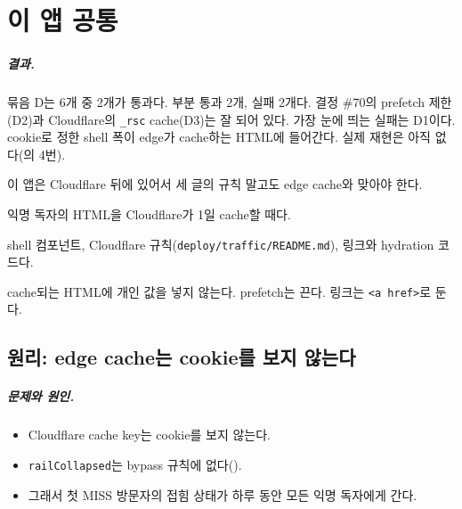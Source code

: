 \chapter{이 앱 공통}\label{ch:cross}

\paragraph{결과.}
묶음 D는 6개 중 2개가 통과다. 부분 통과 2개, 실패 2개다.
결정 \#70의 prefetch 제한(D2)과 Cloudflare의 \texttt{\_rsc} cache(D3)는 잘 되어 있다.
가장 눈에 띄는 실패는 D1이다. cookie로 정한 shell 폭이 edge가 cache하는 HTML에 들어간다.
실제 재현은 아직 없다(의 4번).

\begin{inbrief}
  \item[Why] 이 앱은 Cloudflare 뒤에 있어서 세 글의 규칙 말고도 edge cache와 맞아야 한다.
  \item[When] 익명 독자의 HTML을 Cloudflare가 1일 cache할 때다.
  \item[Where] shell 컴포넌트, Cloudflare 규칙(\texttt{deploy/traffic/README.md}), 링크와 hydration 코드다.
  \item[How] cache되는 HTML에 개인 값을 넣지 않는다. prefetch는 끈다. 링크는 \texttt{<a href>}로 둔다.
\end{inbrief}

\section{원리: edge cache는 cookie를 보지 않는다}\label{sec:cr-principle}

\paragraph{문제와 원인.}
\begin{itemize}[nosep]
  \item Cloudflare cache key는 cookie를 보지 않는다.
  \item \texttt{railCollapsed}는 bypass 규칙에 없다().
  \item 그래서 첫 MISS 방문자의 접힘 상태가 하루 동안 모든 익명 독자에게 간다.
\end{itemize}

